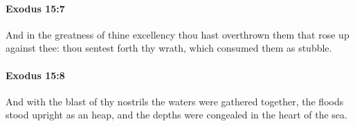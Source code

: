 		\paragraph{Exodus 15:7} %
			\label{EXODUS-15-7}

			And in the greatness of thine excellency thou hast overthrown them that rose up against thee: thou sentest forth thy wrath, which consumed them as stubble.


		\paragraph{Exodus 15:8} %
			\label{EXODUS-15-8}

			And with the blast of thy nostrils the waters were gathered together, the floods stood upright as an heap, and the depths were congealed in the heart of the sea.


